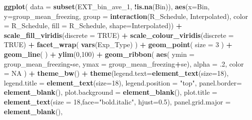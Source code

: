 \documentclass[
]{article}
\newenvironment{Shaded}{\begin{snugshade}}{\end{snugshade}}
\newcommand{\AttributeTok}[1]{\textcolor[rgb]{0.13,0.29,0.53}{#1}}
\newcommand{\ConstantTok}[1]{\textcolor[rgb]{0.56,0.35,0.01}{#1}}
\newcommand{\DecValTok}[1]{\textcolor[rgb]{0.00,0.00,0.81}{#1}}
\newcommand{\FloatTok}[1]{\textcolor[rgb]{0.00,0.00,0.81}{#1}}
\newcommand{\FunctionTok}[1]{\textcolor[rgb]{0.13,0.29,0.53}{\textbf{#1}}}
\newcommand{\NormalTok}[1]{#1}
\newcommand{\SpecialCharTok}[1]{\textcolor[rgb]{0.81,0.36,0.00}{\textbf{#1}}}
\newcommand{\StringTok}[1]{\textcolor[rgb]{0.31,0.60,0.02}{#1}}
\begin{document}
\begin{Shaded}
\begin{Highlighting}[]
\FunctionTok{ggplot}\NormalTok{(}
  \AttributeTok{data =} \FunctionTok{subset}\NormalTok{(EXT\_bin\_ave\_1, }\SpecialCharTok{!}\FunctionTok{is.na}\NormalTok{(Bin)),}
  \FunctionTok{aes}\NormalTok{(}\AttributeTok{x=}\NormalTok{Bin,}
      \AttributeTok{y=}\NormalTok{group\_mean\_freezing,}
      \AttributeTok{group =} \FunctionTok{interaction}\NormalTok{(R\_Schedule, Interpolated),}
      \AttributeTok{color =}\NormalTok{ R\_Schedule,}
      \AttributeTok{fill =}\NormalTok{ R\_Schedule,}
      \AttributeTok{shape=}\NormalTok{Interpolated)) }\SpecialCharTok{+}
  \FunctionTok{scale\_fill\_viridis}\NormalTok{(}\AttributeTok{discrete =} \ConstantTok{TRUE}\NormalTok{) }\SpecialCharTok{+}
  \FunctionTok{scale\_colour\_viridis}\NormalTok{(}\AttributeTok{discrete =} \ConstantTok{TRUE}\NormalTok{) }\SpecialCharTok{+}
  \FunctionTok{facet\_wrap}\NormalTok{(}
    \FunctionTok{vars}\NormalTok{(Exp\_Type)}
\NormalTok{  ) }\SpecialCharTok{+}
  \FunctionTok{geom\_point}\NormalTok{(}
    \AttributeTok{size =} \DecValTok{3}
\NormalTok{  ) }\SpecialCharTok{+}
  \FunctionTok{geom\_line}\NormalTok{(}
\NormalTok{  ) }\SpecialCharTok{+} 
  \FunctionTok{ylim}\NormalTok{(}\DecValTok{0}\NormalTok{,}\DecValTok{100}\NormalTok{) }\SpecialCharTok{+}
  \FunctionTok{geom\_ribbon}\NormalTok{(}
    \FunctionTok{aes}\NormalTok{(}
      \AttributeTok{ymin =}\NormalTok{ group\_mean\_freezing}\SpecialCharTok{{-}}\NormalTok{se,}
      \AttributeTok{ymax =}\NormalTok{ group\_mean\_freezing}\SpecialCharTok{+}\NormalTok{se),}
    \AttributeTok{alpha =}\NormalTok{ .}\DecValTok{2}\NormalTok{,}
    \AttributeTok{color =} \ConstantTok{NA}
\NormalTok{  ) }\SpecialCharTok{+}
  \FunctionTok{theme\_bw}\NormalTok{() }\SpecialCharTok{+}
  \FunctionTok{theme}\NormalTok{(}\AttributeTok{legend.text=}\FunctionTok{element\_text}\NormalTok{(}\AttributeTok{size=}\DecValTok{18}\NormalTok{),}
        \AttributeTok{legend.title =} \FunctionTok{element\_text}\NormalTok{(}\AttributeTok{size=}\DecValTok{18}\NormalTok{),}
        \AttributeTok{legend.position =} \StringTok{"top"}\NormalTok{,}
        \AttributeTok{panel.border=} \FunctionTok{element\_blank}\NormalTok{(),}
        \AttributeTok{plot.background =} \FunctionTok{element\_blank}\NormalTok{(),}
        \AttributeTok{plot.title =} \FunctionTok{element\_text}\NormalTok{(}\AttributeTok{size =} \DecValTok{18}\NormalTok{,}\AttributeTok{face=}\StringTok{"bold.italic"}\NormalTok{, }\AttributeTok{hjust=}\FloatTok{0.5}\NormalTok{),}
        \AttributeTok{panel.grid.major =} \FunctionTok{element\_blank}\NormalTok{(),}

\end{Highlighting}
\end{Shaded}
\end{document}
